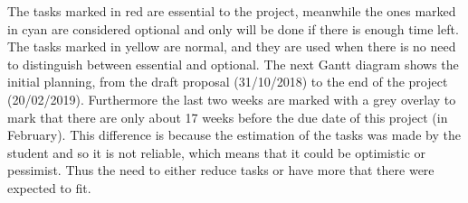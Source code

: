 \newcommand{\Frequirement}{2}

\newcommand{\Plen}{19} %

\newcommand{\Dlen}{0} %

\newcommand{\Cimportant}{red!70}
\newcommand{\Coptional}{cyan!30}
\newcommand{\Cnormal}{yellow!80}


The tasks marked in \colorbox{\Cimportant}{red} are essential to the project, meanwhile the ones marked in \colorbox{\Coptional}{cyan} are considered optional and only will be done if there is enough time left. The tasks marked in \colorbox{\Cnormal}{yellow} are normal, and they are used when there is no need to distinguish between essential and optional.
\linej
\linej
The next Gantt diagram shows the initial planning, from the draft proposal (31/10/2018) to the end of the project (20/02/2019).
\linej
Furthermore the last two weeks are marked with a grey overlay to mark that there are only about 17 weeks before the due date of this project (in February). This difference is because the estimation of the tasks was made by the student and so it is not reliable, which means that it could be optimistic or pessimist. Thus the need to either reduce tasks or have more that there were expected to fit.


